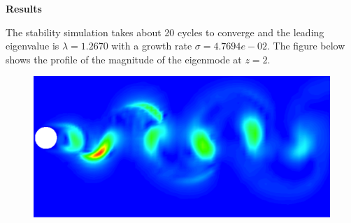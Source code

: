 \textbf{Results}

The stability simulation takes about 20 cycles to converge and the leading eigenvalue is $\lambda=1.2670$ with a growth rate $\sigma=4.7694e-02$. The figure below shows the profile of the magnitude of the eigenmode at $z=2$.

\begin{figure}[!htbp]
\centering
 {\includegraphics[width=1 \textwidth]{Figures/floquet}}
   \caption {}
\end{figure}

